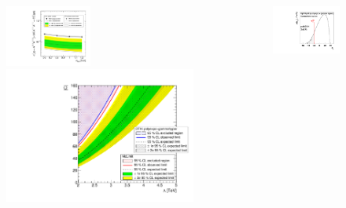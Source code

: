 \begin{frame}
\begin{columns}
\begin{column}{0.7\textwidth}
\begin{center}
\vspace*{-1cm}
\begin{figure}[!htb]
\includegraphics[width=0.45\textwidth]{Figures/FourTops/ExclusionPlot_RPPFullStat_McLimitVsOTHpolyexpo_gammahyper.pdf}
\hspace*{0.4cm}
\includegraphics[width=.47\textwidth]{Figures/FourTops/CVsLambdaForContactInteractionMcLimitVsOTHpolyexpogammahyper.pdf}
\end{figure}
\end{center}
\end{column}
\begin{column}{0.3\textwidth}
\begin{center}
\begin{figure}[!htb]
\includegraphics[width=1\textwidth]{Figures/FourTops/significanceContactInteractionPolyExpoGammaHyper.pdf}
\end{figure}
\end{center}
\end{column}
\end{columns}


\end{frame}

